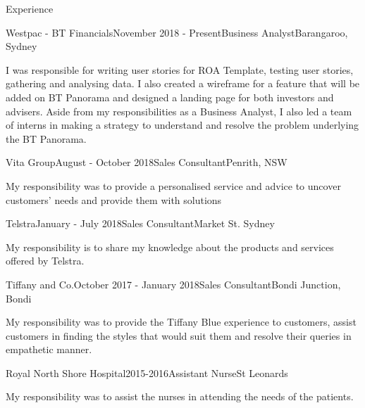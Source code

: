 \documentclass{resume} %
\begin{document}
\begin{rSection}{Experience}

\begin{rSubsection}{Westpac - BT Financials}{November 2018 - Present}{Business Analyst}{Barangaroo, Sydney}
\item I was responsible for writing user stories for ROA Template, testing user stories, gathering and analysing data. I also created a wireframe for a feature that will be added on BT Panorama and designed a landing page for both investors and advisers. Aside from my responsibilities as a Business Analyst, I also led a team of interns in making a strategy to understand and resolve the problem underlying the BT Panorama.
\end{rSubsection}


\begin{rSubsection}{Vita Group}{August - October 2018}{Sales Consultant}{Penrith, NSW}
\item My responsibility was to provide a personalised service and advice to uncover customers' needs and provide them with solutions
\end{rSubsection}


\begin{rSubsection}{Telstra}{January - July 2018}{Sales Consultant}{Market St. Sydney}
\item My responsibility is to share my knowledge about the products and services  offered by Telstra. 
\end{rSubsection}

\begin{rSubsection}{Tiffany and Co.}{October 2017 - January 2018}{Sales Consultant}{Bondi Junction, Bondi}
\item My responsibility was to provide the Tiffany Blue experience to customers, assist customers in finding the styles that would suit them and resolve their queries in empathetic manner.

\end{rSubsection}

\begin{rSubsection}{Royal North Shore Hospital}{2015-2016}{Assistant Nurse}{St Leonards}
\item My responsibility was to assist the nurses in attending the needs of the patients. 

\end{rSubsection}
\end{rSection}
\end{document}
